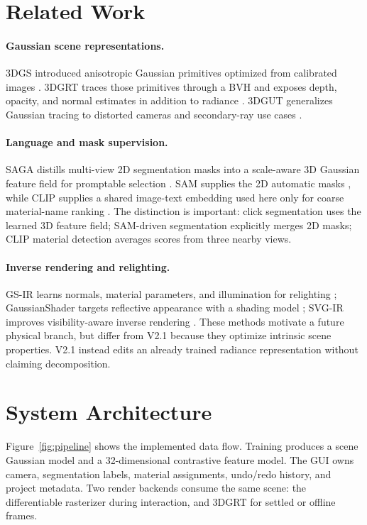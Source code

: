 \documentclass[10pt,twocolumn,a4paper]{article}
\begin{document}
\section{Related Work}
\paragraph{Gaussian scene representations.}
3DGS introduced anisotropic Gaussian primitives optimized from calibrated
images \citep{kerbl2023gaussians}. 3DGRT traces those primitives through a BVH
and exposes depth, opacity, and normal estimates in addition to radiance
\citep{moenne20243dgrt}. 3DGUT generalizes Gaussian tracing to distorted
cameras and secondary-ray use cases \citep{3dgut2025}.

\paragraph{Language and mask supervision.}
SAGA distills multi-view 2D segmentation masks into a scale-aware 3D Gaussian
feature field for promptable selection \citep{cen2023saga}. SAM supplies the
2D automatic masks \citep{kirillov2023sam}, while CLIP supplies a shared
image-text embedding used here only for coarse material-name ranking
\citep{radford2021clip}. The distinction is important: click segmentation uses
the learned 3D feature field; SAM-driven segmentation explicitly merges 2D
masks; CLIP material detection averages scores from three nearby views.

\paragraph{Inverse rendering and relighting.}
GS-IR learns normals, material parameters, and illumination for relighting
\citep{liang2024gsir}; GaussianShader targets reflective appearance with a
shading model \citep{jiang2024gaussianshader}; SVG-IR improves visibility-aware
inverse rendering \citep{svgir2025}. These methods motivate a future physical
branch, but differ from V2.1 because they optimize intrinsic scene properties.
V2.1 instead edits an already trained radiance representation without claiming
decomposition.

\section{System Architecture}
Figure~\ref{fig:pipeline} shows the implemented data flow. Training produces a
scene Gaussian model and a 32-dimensional contrastive feature model. The GUI
owns camera, segmentation labels, material assignments, undo/redo history, and
project metadata. Two render backends consume the same scene: the differentiable
rasterizer during interaction, and 3DGRT for settled or offline frames.
\end{document}

